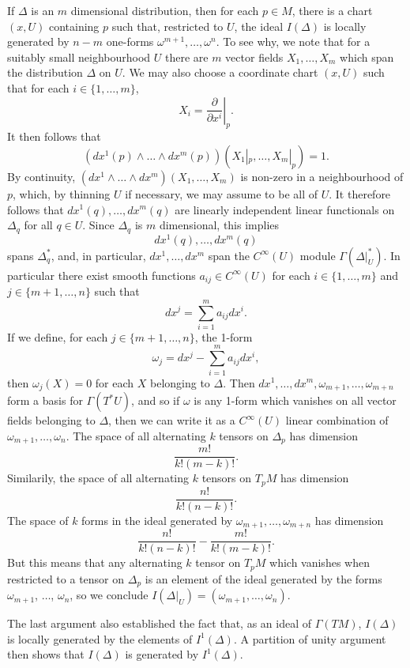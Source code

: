 If $\Delta$ is an $m$ dimensional distribution, then for each $p \in M$, there is a chart $(x,U)$ containing $p$ such that, restricted to $U$, the ideal $I(\Delta)$ is locally generated by $n-m$ one-forms $\omega^{m+1}, \dots, \omega^n$. To see why, we note that for a suitably small neighbourhood $U$ there are $m$ vector fields $X_1, \dots, X_m$ which span the distribution $\Delta$ on $U$. We may also choose a coordinate chart $(x,U)$ such that for each $i \in \{ 1, \dots, m \}$,
%
\[ X_i = \left. \frac{\partial}{\partial x^i} \right|_p. \]
%
It then follows that
%
\[ \left( dx^1(p) \wedge \dots \wedge dx^m(p) \right) \left( X_1|_p, \dots, X_m|_p \right) = 1. \]
%
By continuity, $(dx^1 \wedge \dots \wedge dx^m)(X_1, \dots, X_m)$ is non-zero in a neighbourhood of $p$, which, by thinning $U$ if necessary, we may assume to be all of $U$. It therefore follows that $dx^1(q), \dots, dx^m(q)$ are linearly independent linear functionals on $\Delta_q$ for all $q \in U$. Since $\Delta_q$ is $m$ dimensional, this implies
%
\[ dx^1(q), \dots, dx^m(q) \]
%
spans $\Delta_q^*$, and, in particular, $dx^1, \dots, dx^m$ span the $C^\infty(U)$ module $\Gamma(\Delta|_U^*)$. In particular there exist smooth functions $a_{ij} \in C^\infty(U)$ for each $i \in \{ 1, \dots, m \}$ and $j \in \{ m+1, \dots, n \}$ such that
%
\[ dx^j = \sum_{i = 1}^m a_{ij} dx^i. \]
%
If we define, for each $j \in \{ m+1, \dots, n \}$, the 1-form
%
\[ \omega_j = dx^j - \sum_{i = 1}^m a_{ij} dx^i, \]
%
then $\omega_j(X) = 0$ for each $X$ belonging to $\Delta$. Then $dx^1, \dots, dx^m, \omega_{m+1}, \dots, \omega_{m+n}$ form a basis for $\Gamma(T^*U)$, and so if $\omega$ is any 1-form which vanishes on all vector fields belonging to $\Delta$, then we can write it as a $C^\infty(U)$ linear combination of $\omega_{m+1}, \dots, \omega_n$. The space of all alternating $k$ tensors on $\Delta_p$ has dimension
%
\[ \frac{m!}{k!(m-k)!}. \]
%
Similarily, the space of all alternating $k$ tensors on $T_p M$ has dimension
%
\[ \frac{n!}{k!(n-k)!}. \]
%
The space of $k$ forms in the ideal generated by $\omega_{m+1}, \dots, \omega_{m+n}$ has dimension
%
\[ \frac{n!}{k!(n-k)!} - \frac{m!}{k!(m-k)!}. \]
%
But this means that any alternating $k$ tensor on $T_p M$ which vanishes when restricted to a tensor on $\Delta_p$ is an element of the ideal generated by the forms $\omega_{m+1}$, $\dots$, $\omega_n$, so we conclude $I(\Delta|_U) = (\omega_{m+1}, \dots, \omega_n)$.

\begin{remark}
    The last argument also established the fact that, as an ideal of $\Gamma(TM)$, $I(\Delta)$ is locally generated by the elements of $I^1(\Delta)$. A partition of unity argument then shows that $I(\Delta)$ is generated by $I^1(\Delta)$.
\end{remark}

